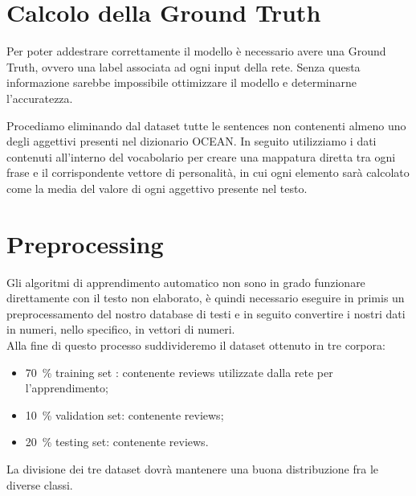 \section{Calcolo della Ground Truth}
\label{sec:GroundTruth}

Per poter addestrare correttamente il modello è necessario avere una Ground Truth, ovvero una label associata ad ogni input della rete. Senza questa informazione sarebbe impossibile ottimizzare il modello e determinarne l'accuratezza. 

Procediamo eliminando dal dataset tutte le sentences non contenenti almeno uno degli aggettivi presenti nel dizionario OCEAN. In seguito utilizziamo i dati contenuti all'interno del vocabolario per creare una mappatura diretta tra ogni frase e il corrispondente vettore di personalità, in cui ogni elemento sarà calcolato come la media del valore di ogni aggettivo presente nel testo.

\section{Preprocessing}
\label{sec:preprocessing}
{\color{blue} Gli algoritmi di apprendimento automatico non sono in grado funzionare direttamente con il testo non elaborato, è quindi necessario eseguire in primis un preprocessamento del nostro database di testi e in seguito convertire i nostri dati in numeri, nello specifico, in vettori di numeri.\\
Alla fine di questo processo suddivideremo il dataset ottenuto in tre corpora: 
\begin{itemize}
	\item \SI{70}{\percent} training set : contenente  reviews utilizzate dalla rete per l'apprendimento;
	\item \SI{10}{\percent} validation set: contenente  reviews;
	\item \SI{20}{\percent} testing set: contenente  reviews.
\end{itemize}
La divisione dei tre dataset dovrà mantenere una buona distribuzione fra le diverse classi.}

